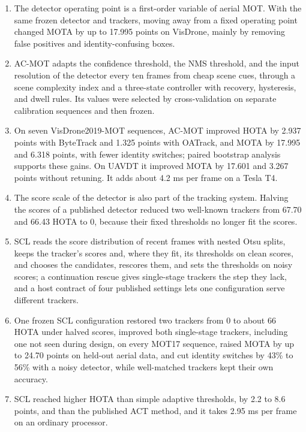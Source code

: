 \begin{enumerate}
\item The detector operating point is a first-order variable of aerial MOT. With the same frozen detector and trackers, moving away from a fixed operating point changed MOTA by up to 17.995 points on VisDrone, mainly by removing false positives and identity-confusing boxes.
\item AC-MOT adapts the confidence threshold, the NMS threshold, and the input resolution of the detector every ten frames from cheap scene cues, through a scene complexity index and a three-state controller with recovery, hysteresis, and dwell rules. Its values were selected by cross-validation on separate calibration sequences and then frozen.
\item On seven VisDrone2019-MOT sequences, AC-MOT improved HOTA by 2.937 points with ByteTrack and 1.325 points with OATrack, and MOTA by 17.995 and 6.318 points, with fewer identity switches; paired bootstrap analysis supports these gains. On UAVDT it improved MOTA by 17.601 and 3.267 points without retuning. It adds about 4.2 ms per frame on a Tesla T4.
\item The score scale of the detector is also part of the tracking system. Halving the scores of a published detector reduced two well-known trackers from 67.70 and 66.43 HOTA to 0, because their fixed thresholds no longer fit the scores.
\item SCL reads the score distribution of recent frames with nested Otsu splits, keeps the tracker's scores and, where they fit, its thresholds on clean scores, and chooses the candidates, rescores them, and sets the thresholds on noisy scores; a continuation rescue gives single-stage trackers the step they lack, and a host contract of four published settings lets one configuration serve different trackers.
\item One frozen SCL configuration restored two trackers from 0 to about 66 HOTA under halved scores, improved both single-stage trackers, including one not seen during design, on every MOT17 sequence, raised MOTA by up to 24.70 points on held-out aerial data, and cut identity switches by 43\% to 56\% with a noisy detector, while well-matched trackers kept their own accuracy.
\item SCL reached higher HOTA than simple adaptive thresholds, by 2.2 to 8.6 points, and than the published ACT method, and it takes 2.95 ms per frame on an ordinary processor.
\end{enumerate}

